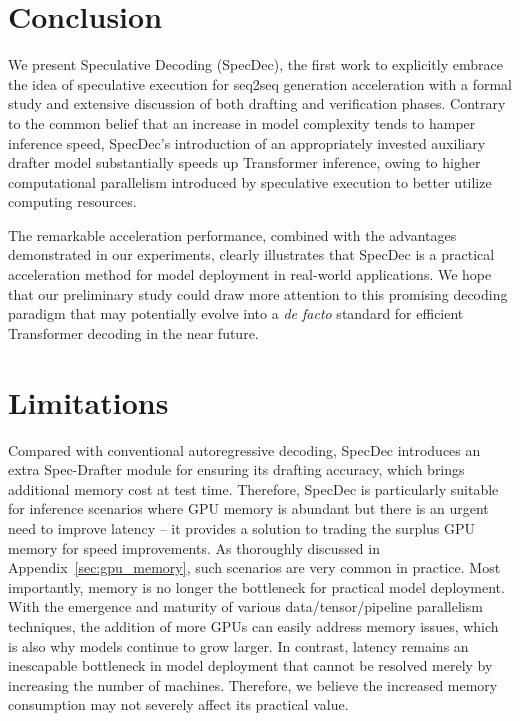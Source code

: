 \section{Conclusion}
We present Speculative Decoding (SpecDec), the first work to explicitly embrace the idea of speculative execution for seq2seq generation acceleration with a formal study and extensive discussion of both drafting and verification phases. Contrary to the common belief that an increase in model complexity tends to hamper inference speed, SpecDec’s introduction of an appropriately invested auxiliary drafter model substantially speeds up Transformer inference, owing to higher computational parallelism introduced by speculative execution to better utilize computing resources. 

The remarkable acceleration performance, combined with the advantages demonstrated in our experiments, clearly illustrates that SpecDec is a practical acceleration method for model deployment in real-world applications. We hope that our preliminary study could draw more attention to this promising decoding paradigm that may potentially evolve into a \textit{de facto} standard for efficient Transformer decoding in the near future.

\section*{Limitations}\label{subsec:limitation} Compared with conventional autoregressive decoding, SpecDec introduces an extra Spec-Drafter module for ensuring its drafting accuracy, which brings additional memory cost at test time. Therefore, SpecDec is particularly suitable for inference scenarios where GPU memory is abundant but there is an urgent need to improve latency -- it provides a solution to trading the surplus GPU memory for speed improvements. As thoroughly discussed in Appendix~\ref{sec:gpu_memory}, such scenarios are very common in practice. Most importantly, memory is no longer the bottleneck for practical model deployment. With the emergence and maturity of various data/tensor/pipeline parallelism techniques, the addition of more GPUs can easily address memory issues, which is also why models continue to grow larger. In contrast, latency remains an inescapable bottleneck in model deployment that cannot be resolved merely by increasing the number of machines. Therefore, we believe the increased memory consumption may not severely affect its practical value.


